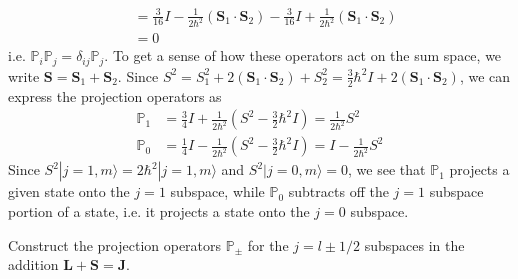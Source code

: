 \documentclass[../principles-of-quantum-mechanics.tex]{subfiles}
\begin{document}
\begin{questions}
\begin{solution}
\begin{align*}
				&= \frac{3}{16}I - \frac{1}{2\hbar^2}(\mathbf{S}_1\cdot\mathbf{S}_2) - \frac{3}{16}I + \frac{1}{2\hbar^2}(\mathbf{S}_1\cdot\mathbf{S}_2) \\
				&= 0
			\end{align*}
			i.e. $\mathbb{P}_i\mathbb{P}_j = \delta_{ij}\mathbb{P}_j$. To get a sense of how these operators act on the sum space, we write $\mathbf{S} = \mathbf{S}_1 + \mathbf{S}_2$. Since $S^2 = S_1^2 + 2(\mathbf{S}_1\cdot\mathbf{S}_2) + S_2^2 = \tfrac{3}{2}\hbar^2I + 2(\mathbf{S}_1\cdot\mathbf{S}_2)$, we can express the projection operators as
			\begin{align*}
				\mathbb{P}_1 &= \frac{3}{4}I + \frac{1}{2\hbar^2}(S^2 - \tfrac{3}{2}\hbar^2I) =\frac{1}{2\hbar^2}S^2 \\
				\mathbb{P}_0 &= \frac{1}{4}I - \frac{1}{2\hbar^2}(S^2 - \tfrac{3}{2}\hbar^2I) = I - \frac{1}{2\hbar^2}S^2
			\end{align*}
			Since $S^2|j = 1, m\rangle = 2\hbar^2|j = 1, m\rangle$ and $S^2|j = 0, m\rangle = 0$, we see that $\mathbb{P}_1$ projects a given state onto the $j = 1$ subspace, while $\mathbb{P}_0$ subtracts off the $j = 1$ subspace portion of a state, i.e. it projects a state onto the $j = 0$ subspace.
		\end{solution}
	
		\question Construct the projection operators $\mathbb{P}_\pm$ for the $j = l \pm 1/2$ subspaces in the addition $\mathbf{L}+\mathbf{S}=\mathbf{J}$.
		

\end{questions}
\end{document}
